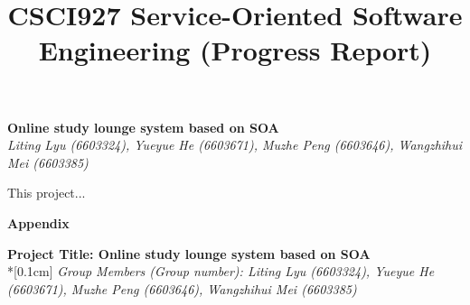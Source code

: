 \documentclass[runningheads]{llncs}
\begin{document}
\title{\large{CSCI927 Service-Oriented Software Engineering (Progress Report)}}
\author{}
\institute{}
\maketitle
\vspace{-1cm}



\begin{center}
\Large{\textbf{Online study lounge system based on SOA}} \\ %
\vspace{0.2cm}
\large{\emph{ Liting Lyu (6603324), Yueyue  He (6603671), Muzhe Peng (6603646), Wangzhihui Mei (6603385)}}\\%
\vspace{0.3cm}
\end{center}

\noindent This project...



\clearpage
\begin{flushleft}
    \huge{\textbf{Appendix}}
\end{flushleft}
\begin{center}
    \Large{\textbf{Project Title: Online study lounge system based on SOA }} \\*[0.1cm]%
    \large{\emph{Group Members (Group number): Liting Lyu (6603324), Yueyue  He (6603671), Muzhe Peng (6603646), Wangzhihui Mei (6603385)}} %
\end{center}
  
    \noindent 
    
\end{document}
